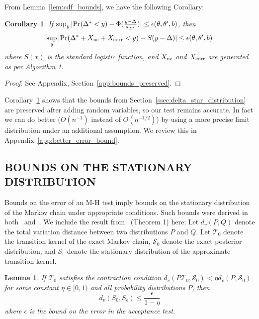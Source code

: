 \documentclass[letterpaper]{article}
\newtheorem{lemma}{Lemma}
\newtheorem{corollary}{Corollary}
\begin{document}
From Lemma~\ref{lem:cdf_bounds}, we have the following Corollary:

\begin{corollary}\label{cor:bounds_preserved}
If $\sup_y|{\rm Pr}(\Delta^* < y) - \Phi(\frac{y-\Delta}{s_{\Delta^*}})|
\leq \epsilon(\theta,\theta',b)$, then
\[
    \sup_y|{\rm Pr}(\Delta^*+X_{\rm nc}+X_{\rm corr} < y) - S(y-\Delta)| \leq \epsilon(\theta,\theta',b)
\]
where $S(x)$ is the standard logistic function, and $X_{\rm nc}$ and $X_{\rm
corr}$ are generated as per Algorithm 1.
\end{corollary}

\begin{proof}
See Appendix, Section~\ref{app:bounds_preserved}.
\end{proof}

Corollary~\ref{cor:bounds_preserved} shows that the bounds from
Section~\ref{ssec:delta_star_distribution} are preserved after adding random
variables, so our test remains accurate.  In fact we can do better ($O(n^{-1})$
instead of $O(n^{-1/2})$) by using a more precise limit distribution under an
additional assumption. We review this in Appendix~\ref{app:better_error_bound}.

\subsection{BOUNDS ON THE STATIONARY DISTRIBUTION}
Bounds on the error of an M-H test imply bounds on the stationary distribution
of the Markov chain under appropriate conditions. Such bounds were derived in
both~\citep{cutting_mh_2014} and~\citep{icml2014c1_bardenet14}. We include the
result from~\citep{cutting_mh_2014} (Theorem 1) here: Let $d_v(P,Q)$ denote the
total variation distance between two distributions $P$ and $Q$.  Let
$\mathcal{T}_0$ denote the transition kernel of the exact Markov chain,
$\mathcal{S}_0$ denote the exact posterior distribution, and
$\mathcal{S}_{\epsilon}$ denote the stationary distribution of the approximate
transition kernel. 
\begin{lemma}
If $\mathcal{T}_0$ satisfies the contraction condition
$d_v(P\mathcal{T}_0,\mathcal{S}_0) < \eta d_v(P,\mathcal{S}_0)$ for some
constant $\eta\in [0,1)$ and all probability distributions $P$, then
\begin{equation}
      d_v(S_0, S_{\epsilon}) \leq\frac{\epsilon}{1-\eta}
\end{equation}
where $\epsilon$ is the bound on the error in the acceptance test. 
\end{lemma}
\end{document}
